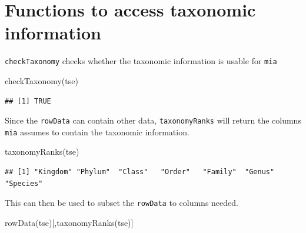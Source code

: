 \documentclass[
]{book}
\newenvironment{Shaded}{\begin{snugshade}}{\end{snugshade}}
\newcommand{\FunctionTok}[1]{\textcolor[rgb]{0.00,0.00,0.00}{#1}}
\newcommand{\NormalTok}[1]{#1}
\begin{document}
\hypertarget{functions-to-access-taxonomic-information}{%
\section{Functions to access taxonomic information}\label{functions-to-access-taxonomic-information}}

\texttt{checkTaxonomy} checks whether the taxonomic information is usable for \texttt{mia}

\begin{Shaded}
\begin{Highlighting}[]
\FunctionTok{checkTaxonomy}\NormalTok{(tse)}
\end{Highlighting}
\end{Shaded}

\begin{verbatim}
## [1] TRUE
\end{verbatim}

Since the \texttt{rowData} can contain other data, \texttt{taxonomyRanks} will return the
columns \texttt{mia} assumes to contain the taxonomic information.

\begin{Shaded}
\begin{Highlighting}[]
\FunctionTok{taxonomyRanks}\NormalTok{(tse)}
\end{Highlighting}
\end{Shaded}

\begin{verbatim}
## [1] "Kingdom" "Phylum"  "Class"   "Order"   "Family"  "Genus"   "Species"
\end{verbatim}

This can then be used to subset the \texttt{rowData} to columns needed.

\begin{Shaded}
\begin{Highlighting}[]
\FunctionTok{rowData}\NormalTok{(tse)[,}\FunctionTok{taxonomyRanks}\NormalTok{(tse)]}
\end{Highlighting}
\end{Shaded}
\end{document}
